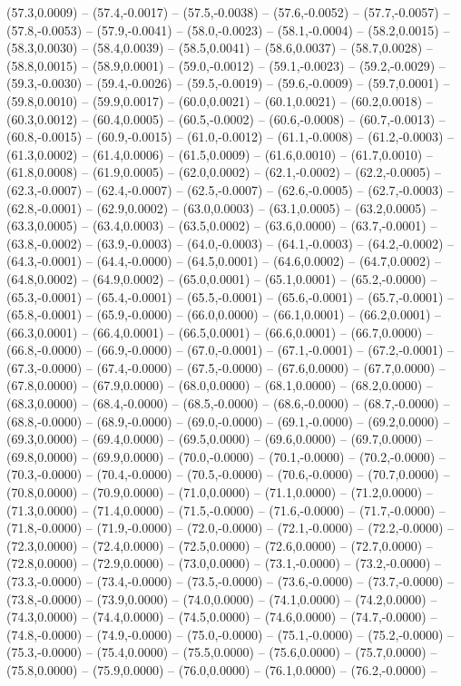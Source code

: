 \documentclass{SVnote}
\begin{document}
(57.3,0.0009) -- (57.4,-0.0017) -- (57.5,-0.0038) -- (57.6,-0.0052) -- (57.7,-0.0057) -- (57.8,-0.0053) -- (57.9,-0.0041) -- (58.0,-0.0023) -- (58.1,-0.0004) -- (58.2,0.0015) -- (58.3,0.0030) -- (58.4,0.0039) -- (58.5,0.0041) -- (58.6,0.0037) -- (58.7,0.0028) -- (58.8,0.0015) -- (58.9,0.0001) -- (59.0,-0.0012) -- (59.1,-0.0023) -- (59.2,-0.0029) -- (59.3,-0.0030) -- (59.4,-0.0026) -- (59.5,-0.0019) -- (59.6,-0.0009) -- (59.7,0.0001) -- (59.8,0.0010) -- (59.9,0.0017) -- (60.0,0.0021) -- (60.1,0.0021) -- (60.2,0.0018) -- (60.3,0.0012) -- (60.4,0.0005) -- (60.5,-0.0002) -- (60.6,-0.0008) -- (60.7,-0.0013) -- (60.8,-0.0015) -- (60.9,-0.0015) -- (61.0,-0.0012) -- (61.1,-0.0008) -- (61.2,-0.0003) -- (61.3,0.0002) -- (61.4,0.0006) -- (61.5,0.0009) -- (61.6,0.0010) -- (61.7,0.0010) -- (61.8,0.0008) -- (61.9,0.0005) -- (62.0,0.0002) -- (62.1,-0.0002) -- (62.2,-0.0005) -- (62.3,-0.0007) -- (62.4,-0.0007) -- (62.5,-0.0007) -- (62.6,-0.0005) -- (62.7,-0.0003) -- (62.8,-0.0001) -- (62.9,0.0002) -- (63.0,0.0003) -- (63.1,0.0005) -- (63.2,0.0005) -- (63.3,0.0005) -- (63.4,0.0003) -- (63.5,0.0002) -- (63.6,0.0000) -- (63.7,-0.0001) -- (63.8,-0.0002) -- (63.9,-0.0003) -- (64.0,-0.0003) -- (64.1,-0.0003) -- (64.2,-0.0002) -- (64.3,-0.0001) -- (64.4,-0.0000) -- (64.5,0.0001) -- (64.6,0.0002) -- (64.7,0.0002) -- (64.8,0.0002) -- (64.9,0.0002) -- (65.0,0.0001) -- (65.1,0.0001) -- (65.2,-0.0000) -- (65.3,-0.0001) -- (65.4,-0.0001) -- (65.5,-0.0001) -- (65.6,-0.0001) -- (65.7,-0.0001) -- (65.8,-0.0001) -- (65.9,-0.0000) -- (66.0,0.0000) -- (66.1,0.0001) -- (66.2,0.0001) -- (66.3,0.0001) -- (66.4,0.0001) -- (66.5,0.0001) -- (66.6,0.0001) -- (66.7,0.0000) -- (66.8,-0.0000) -- (66.9,-0.0000) -- (67.0,-0.0001) -- (67.1,-0.0001) -- (67.2,-0.0001) -- (67.3,-0.0000) -- (67.4,-0.0000) -- (67.5,-0.0000) -- (67.6,0.0000) -- (67.7,0.0000) -- (67.8,0.0000) -- (67.9,0.0000) -- (68.0,0.0000) -- (68.1,0.0000) -- (68.2,0.0000) -- (68.3,0.0000) -- (68.4,-0.0000) -- (68.5,-0.0000) -- (68.6,-0.0000) -- (68.7,-0.0000) -- (68.8,-0.0000) -- (68.9,-0.0000) -- (69.0,-0.0000) -- (69.1,-0.0000) -- (69.2,0.0000) -- (69.3,0.0000) -- (69.4,0.0000) -- (69.5,0.0000) -- (69.6,0.0000) -- (69.7,0.0000) -- (69.8,0.0000) -- (69.9,0.0000) -- (70.0,-0.0000) -- (70.1,-0.0000) -- (70.2,-0.0000) -- (70.3,-0.0000) -- (70.4,-0.0000) -- (70.5,-0.0000) -- (70.6,-0.0000) -- (70.7,0.0000) -- (70.8,0.0000) -- (70.9,0.0000) -- (71.0,0.0000) -- (71.1,0.0000) -- (71.2,0.0000) -- (71.3,0.0000) -- (71.4,0.0000) -- (71.5,-0.0000) -- (71.6,-0.0000) -- (71.7,-0.0000) -- (71.8,-0.0000) -- (71.9,-0.0000) -- (72.0,-0.0000) -- (72.1,-0.0000) -- (72.2,-0.0000) -- (72.3,0.0000) -- (72.4,0.0000) -- (72.5,0.0000) -- (72.6,0.0000) -- (72.7,0.0000) -- (72.8,0.0000) -- (72.9,0.0000) -- (73.0,0.0000) -- (73.1,-0.0000) -- (73.2,-0.0000) -- (73.3,-0.0000) -- (73.4,-0.0000) -- (73.5,-0.0000) -- (73.6,-0.0000) -- (73.7,-0.0000) -- (73.8,-0.0000) -- (73.9,0.0000) -- (74.0,0.0000) -- (74.1,0.0000) -- (74.2,0.0000) -- (74.3,0.0000) -- (74.4,0.0000) -- (74.5,0.0000) -- (74.6,0.0000) -- (74.7,-0.0000) -- (74.8,-0.0000) -- (74.9,-0.0000) -- (75.0,-0.0000) -- (75.1,-0.0000) -- (75.2,-0.0000) -- (75.3,-0.0000) -- (75.4,0.0000) -- (75.5,0.0000) -- (75.6,0.0000) -- (75.7,0.0000) -- (75.8,0.0000) -- (75.9,0.0000) -- (76.0,0.0000) -- (76.1,0.0000) -- (76.2,-0.0000) -- 
\end{document}
